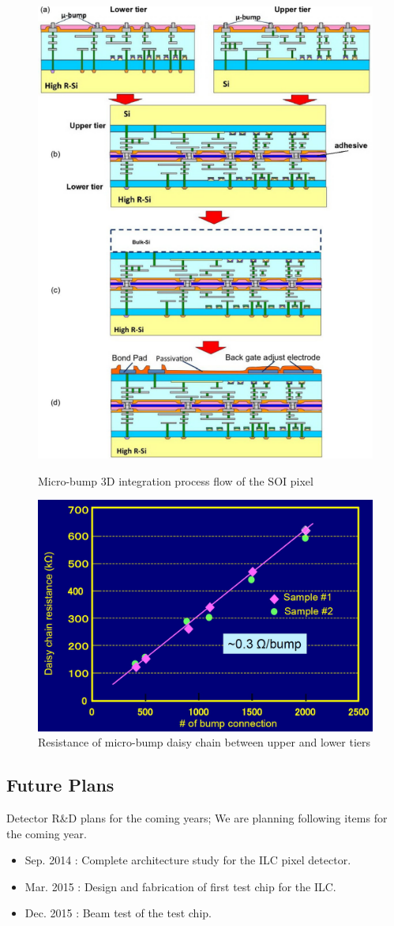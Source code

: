 \begin{figure}
	\begin{minipage}{0.35\textwidth}
		\centering
   		\includegraphics*[width=.5\textwidth,keepaspectratio]{VertexDetector/SOI/microBump3DIntegration}
		\caption{Micro-bump 3D integration process flow of the SOI pixel}
		\label{fig:VertexDetector:SOI:microbump3D}
 	\end{minipage}
 \hfill
 \begin{minipage}{0.64\textwidth}
 \centering
    \includegraphics*[width=\textwidth,keepaspectratio]{VertexDetector/SOI/BumpResistance.jpg}
	\caption{Resistance of micro-bump daisy chain between upper and lower tiers}
	\label{fig:VertexDetector:SOI:resistanceOfDaisyChain}
 \end{minipage}
 \end{figure}

\subsection{Future Plans}
Detector R\&D plans for the coming years;
We are planning following items for the coming year.
\begin{itemize}
\item Sep. 2014 : Complete architecture study for the ILC pixel detector.
\item Mar. 2015 : Design and fabrication of first test chip for the ILC.
\item Dec. 2015 : Beam test of the test chip.
\end{itemize}

